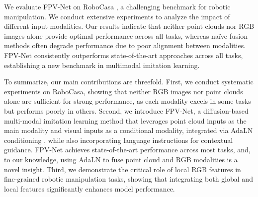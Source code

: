 We evaluate FPV-Net on RoboCasa \citep{robocasa2024}, a challenging benchmark for robotic manipulation. We conduct extensive experiments to analyze the impact of different input modalities. Our results indicate that neither point clouds nor RGB images alone provide optimal performance across all tasks, whereas naïve fusion methods often degrade performance due to poor alignment between modalities.
FPV-Net consistently outperforms state-of-the-art approaches \cite{ke20243d,ze20243d} across all tasks, establishing a new benchmark in multimodal imitation learning.


    


To summarize, our main contributions are threefold. First, we conduct systematic experiments on RoboCasa, showing that neither RGB images nor point clouds alone are sufficient for strong performance, as each modality excels in some tasks but performs poorly in others. Second, we introduce FPV-Net, a diffusion-based multi-modal imitation learning method that leverages point cloud inputs as the main modality and visual inputs as a conditional modality, integrated via AdaLN conditioning \cite{Peebles2022DiT}, while also incorporating language instructions for contextual guidance. FPV-Net achieves state-of-the-art performance across most tasks, and, to our knowledge, using AdaLN to fuse point cloud and RGB modalities is a novel insight. Third, we demonstrate the critical role of local RGB features in fine-grained robotic manipulation tasks, showing that integrating both global and local features significantly enhances model performance.






